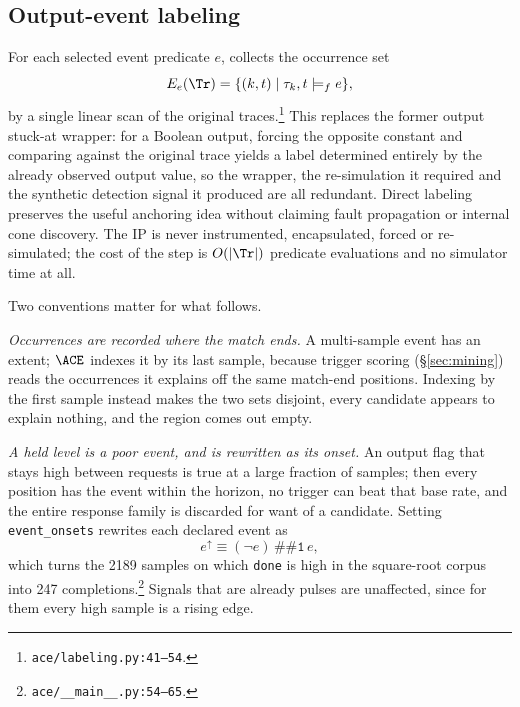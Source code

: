 %

\subsection{Output-event labeling}
\label{sec:labeling}
For each selected event predicate $e$, \ACE{} collects the occurrence set
\begin{equation}
E_e(\Tr)=\{(k,t)\mid \tau_k,t\models_f e\},
\end{equation}
by a single linear scan of the original traces.\footnote{\texttt{ace/labeling.py:41--54}.}
This replaces the former output stuck-at wrapper: for a Boolean output, forcing the opposite
constant and comparing against the original trace yields a label determined entirely by the
already observed output value, so the wrapper, the re-simulation it required and the
synthetic detection signal it produced are all redundant. Direct labeling preserves the
useful anchoring idea without claiming fault propagation or internal cone discovery. The IP
is never instrumented, encapsulated, forced or re-simulated; the cost of the step is
$O(|\Tr|)$ predicate evaluations and no simulator time at all.

Two conventions matter for what follows.

\emph{Occurrences are recorded where the match ends.} A multi-sample event has an extent;
$\ACE$ indexes it by its last sample, because trigger scoring (\S\ref{sec:mining}) reads the
occurrences it explains off the same match-end positions. Indexing by the first sample
instead makes the two sets disjoint, every candidate appears to explain nothing, and the
region comes out empty.

\emph{A held level is a poor event, and is rewritten as its onset.} An output flag that
stays high between requests is true at a large fraction of samples; then every position has
the event within the horizon, no trigger can beat that base rate, and the entire response
family is discarded for want of a candidate. Setting \texttt{event\_onsets} rewrites each
declared event as
\begin{equation}
e^{\uparrow}\equiv(\lnot e)\,\texttt{\#\#1}\,e ,
\end{equation}
which turns the 2189 samples on which \texttt{done} is high in the square-root corpus into
247 completions.\footnote{\texttt{ace/\_\_main\_\_.py:54--65}.} Signals that are already
pulses are unaffected, since for them every high sample is a rising edge.

